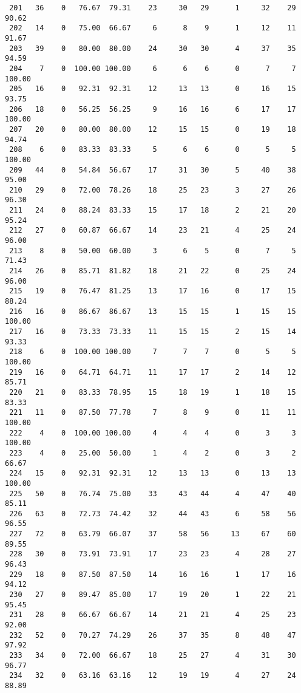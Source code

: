 \begin{verbatim}
 201   36    0   76.67  79.31    23     30   29      1     32    29    90.62
 202   14    0   75.00  66.67     6      8    9      1     12    11    91.67
 203   39    0   80.00  80.00    24     30   30      4     37    35    94.59
 204    7    0  100.00 100.00     6      6    6      0      7     7   100.00
 205   16    0   92.31  92.31    12     13   13      0     16    15    93.75
 206   18    0   56.25  56.25     9     16   16      6     17    17   100.00
 207   20    0   80.00  80.00    12     15   15      0     19    18    94.74
 208    6    0   83.33  83.33     5      6    6      0      5     5   100.00
 209   44    0   54.84  56.67    17     31   30      5     40    38    95.00
 210   29    0   72.00  78.26    18     25   23      3     27    26    96.30
 211   24    0   88.24  83.33    15     17   18      2     21    20    95.24
 212   27    0   60.87  66.67    14     23   21      4     25    24    96.00
 213    8    0   50.00  60.00     3      6    5      0      7     5    71.43
 214   26    0   85.71  81.82    18     21   22      0     25    24    96.00
 215   19    0   76.47  81.25    13     17   16      0     17    15    88.24
 216   16    0   86.67  86.67    13     15   15      1     15    15   100.00
 217   16    0   73.33  73.33    11     15   15      2     15    14    93.33
 218    6    0  100.00 100.00     7      7    7      0      5     5   100.00
 219   16    0   64.71  64.71    11     17   17      2     14    12    85.71
 220   21    0   83.33  78.95    15     18   19      1     18    15    83.33
 221   11    0   87.50  77.78     7      8    9      0     11    11   100.00
 222    4    0  100.00 100.00     4      4    4      0      3     3   100.00
 223    4    0   25.00  50.00     1      4    2      0      3     2    66.67
 224   15    0   92.31  92.31    12     13   13      0     13    13   100.00
 225   50    0   76.74  75.00    33     43   44      4     47    40    85.11
 226   63    0   72.73  74.42    32     44   43      6     58    56    96.55
 227   72    0   63.79  66.07    37     58   56     13     67    60    89.55
 228   30    0   73.91  73.91    17     23   23      4     28    27    96.43
 229   18    0   87.50  87.50    14     16   16      1     17    16    94.12
 230   27    0   89.47  85.00    17     19   20      1     22    21    95.45
 231   28    0   66.67  66.67    14     21   21      4     25    23    92.00
 232   52    0   70.27  74.29    26     37   35      8     48    47    97.92
 233   34    0   72.00  66.67    18     25   27      4     31    30    96.77
 234   32    0   63.16  63.16    12     19   19      4     27    24    88.89

\end{verbatim}
